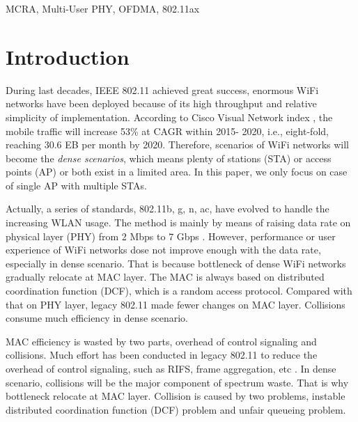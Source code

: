 \documentclass[journal]{IEEEtran}
\begin{document}
\begin{IEEEkeywords}
MCRA, Multi-User PHY, OFDMA, 802.11ax
\end{IEEEkeywords}






%
\IEEEpeerreviewmaketitle
\section{Introduction}		\label{Intro}

During last decades, IEEE 802.11 achieved great success, enormous WiFi networks have been deployed because of its high throughput and relative simplicity of implementation.
According to Cisco Visual Network index \cite{cisco2016}, the mobile traffic will increase 53\% at CAGR within 2015-
2020, i.e., eight-fold, reaching 30.6 EB per month by 2020.
Therefore, scenarios of WiFi networks will become the \textit{dense scenarios}, which means plenty of stations (STA) or access points (AP) or both exist in a limited area. 
In this paper, we only focus on case of single AP with multiple STAs. 

Actually, a series of standards, 802.11b, g, n, ac, have evolved to handle the increasing WLAN usage.
The method is mainly by means of raising data rate on physical layer (PHY)  from 2 Mbps to 7 Gbps \cite{perahia2013next}.
However, performance or user experience of WiFi networks dose not improve enough with the data rate, especially in dense scenario. 
That is because bottleneck of dense WiFi networks gradually relocate at MAC layer.
The MAC is always based on distributed coordination function (DCF), which is a random access protocol. 
Compared with that on PHY layer, legacy 802.11 made fewer changes on MAC layer. 
Collisions consume much efficiency in dense scenario.

MAC efficiency is wasted by two parts, overhead of control signaling and collisions.
Much effort has been conducted in legacy 802.11 to reduce the overhead of control signaling, such as RIFS, frame aggregation, etc \cite{perahia2013next}. 
In dense scenario, collisions will be the major component of spectrum waste.
That is why bottleneck relocate at MAC layer.
Collision is caused by two problems, instable distributed coordination function (DCF) problem and unfair queueing problem.
\end{document}
